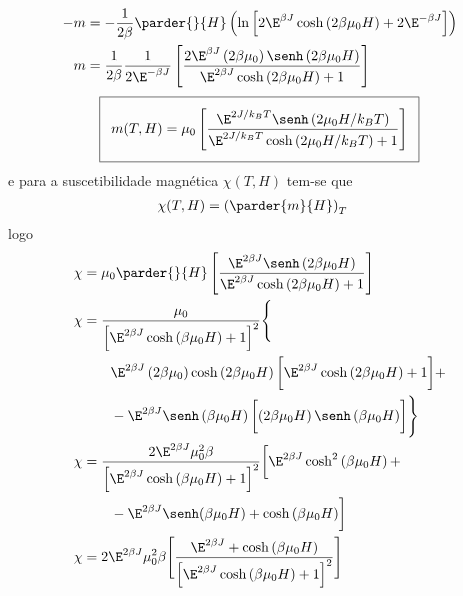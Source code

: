 \begin{prob}
\begin{sol}
\begin{enumerate}[label=\alph *)]
\begin{align}
\begin{split}
          -m&=-\frac{1}{2\beta}\parder{}{H}\left(\ln \left[2\E^{\beta J}\cosh\left(2\beta\mu_0H\right)+2\E^{-\beta J}\right]\right)\\
          m&=\frac{1}{2\beta}\frac{1}{2\E^{-\beta J}}\left[\frac{2\E^{\beta J}\left(2\beta\mu_0\right)\senh\left(2\beta\mu_0H\right)}{\E^{2\beta J}\cosh\left(2\beta\mu_0H\right)+1}\right]\\
        \end{split}
      \end{align}
      \begin{align}
        \addtolength{\fboxsep}{5pt}
         \boxed{
         \begin{gathered}
          m(T,H)=\mu_0\left[\frac{\E^{2J/k_BT}\senh\left(2\mu_0H/k_BT\right)}{\E^{2J/k_BT}\cosh\left(2\mu_0H/k_BT\right)+1}\right]               
         \end{gathered}
        }    
      \end{align}
      e para a suscetibilidade magnética $\chi(T,H)$ tem-se que
      \begin{align}
        \chi(T,H)&=\left(\parder{m}{H}\right)_T
      \end{align}
      logo     
     \begin{align}
        \begin{split}
	        \chi&=\mu_0\parder{}{H}\left[\frac{\E^{2\beta J}\senh\left(2\beta\mu_0H\right)}{\E^{2\beta J}\cosh\left(2\beta\mu_0H\right)+1}\right]\\
	        \chi&=\frac{\mu_0}{\left[\E^{2\beta J}\cosh\left(\beta\mu_0H\right)+1\right]^2}\Bigg\{\\
          &\qquad\E^{2\beta J}\left(2\beta\mu_0\right)\cosh\left(2\beta\mu_0H\right)\biggl[\E^{2\beta J}\cosh\left(2\beta\mu_0H\right)+1\biggr]+\\
          &\qquad-\E^{2\beta J}\senh\left(\beta\mu_0H\right)\biggl[\left(2\beta\mu_0H\right)\senh\left(\beta\mu_0H\right)\biggr]\Bigg\}\\
          \chi&=\frac{2\E^{2\beta J}\mu_0^2\beta}{\left[\E^{2\beta J}\cosh\left(\beta\mu_0H\right)+1\right]^2}\biggl[\E^{2\beta J}\cosh^2\left(\beta\mu_0H\right)+\\
          &\qquad-\E^{2\beta J}\senh(\beta\mu_0H)+\cosh\left(\beta\mu_0H\right)\biggr]\\
          \chi&=2\E^{2\beta J}\mu_0^2\beta\Biggl[\frac{\E^{2\beta J}+\cosh\left(\beta\mu_0H\right)}{\left[\E^{2\beta J}\cosh\left(\beta\mu_0H\right)+1\right]^2}\Biggr]
	      \end{split}
      \end{align}

\end{enumerate}
\end{sol}
\end{prob}

